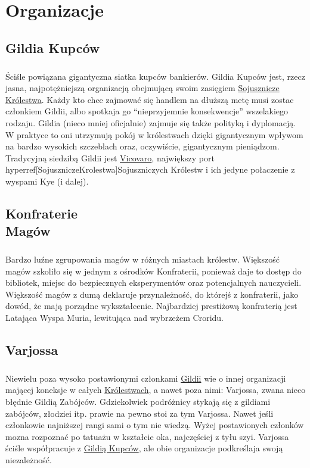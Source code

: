 \chapter{Organizacje}

\label{GildiaKupcow}
\section{Gildia Kupców}
\paragraph{}
Ściśle powiązana gigantyczna siatka kupców bankierów.
Gildia Kupców jest, rzecz jasna, najpotężniejszą organizacją obejmującą swoim zasięgiem \hyperref[SojuszniczeKrolestwa]{Sojusznicze Królestwa}.
Każdy kto chce zajmować się handlem na dłuższą metę musi zostac członkiem Gildii, albo spotkaja go “nieprzyjemnie konsekwencje” wszelakiego rodzaju.
Gildia (nieco mniej oficjalnie) zajmuje się także polityką i dyplomacją.
W praktyce to oni utrzymują pokój w królestwach dzięki gigantycznym wpływom na bardzo wysokich szczeblach oraz, oczywiście, gigantycznym pieniądzom.
Tradycyjną siedzibą Gildii jest \hyperref[Vicovaro]{Vicovaro}, największy port hyperref[SojuszniczeKrolestwa]{Sojuszniczych Królestw} i ich jedyne połaczenie z wyspami Kye (i dalej).

\label{KonfraterieMagow}
\section[Konfraterie Magów]{Konfraterie\\Magów}
\paragraph{}
Bardzo luźne zgrupowania magów w różnych miastach królestw.
Większość magów szkoliło się w jednym z ośrodków Konfraterii, ponieważ daje to dostęp do bibliotek, miejsc do bezpiecznych eksperymentów oraz potencjalnych nauczycieli.
Większość magów z dumą deklaruje przynależność, do którejś z konfraterii, jako dowód, że mają porządne wykształcenie.
Najbardziej prestiżową konfraterią jest Latająca Wyspa Muria, lewitująca nad wybrzeżem Croridu.

\label{Varjossa}
\section{Varjossa}
\paragraph{}
Niewielu poza wysoko postawionymi członkami \hyperref[GildiaKupcow]{Gildii} wie o innej organizacji mającej koneksje w całych \hyperref[SojuczniczeKrolestwa]{Królestwach}, a nawet poza nimi: Varjossa, zwana nieco błędnie Gildią Zabójców.
Gdziekolwiek podróżnicy stykają się z gildiami zabójców, złodziei itp. prawie na pewno stoi za tym Varjossa.
Nawet jeśli członkowie najniższej rangi sami o tym nie wiedzą.
Wyżej postawionych członków mozna rozpoznać po tatuażu w kształcie oka, najczęściej z tyłu szyi.
Varjossa ściśle współpracuje z \hyperref[GildiaKupcow]{Gildią Kupców}, ale obie organizacje podkreślaja swoją niezależność.

